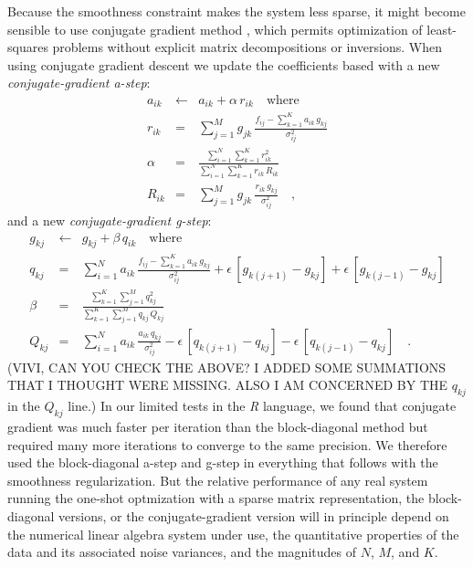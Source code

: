 \documentclass[12pt,preprint]{aastex}
\newcommand{\project}[1]{\textsl{#1}}
\begin{document}
Because the smoothness constraint makes the system less sparse, it
might become sensible to use conjugate gradient method \citep[for
  example,][]{shewchuk}, which permits optimization of least-squares
problems without explicit matrix decompositions or inversions.  When
using conjugate gradient descent we update the coefficients based with
a new \emph{conjugate-gradient a-step}:
\begin{eqnarray}\label{eq:astep_conj}\displaystyle
a_{ik} & \gets & a_{ik}+\alpha\,r_{ik} \quad \mbox{where} \nonumber\\
r_{ik} & = & \sum_{j=1}^{M}g_{jk}\,\frac{f_{ij}-\sum_{k=1}^{K}a_{ik}\,g_{kj}}{\sigma^2_{ij}} \nonumber\\
\alpha & = & \frac{\sum_{i=1}^{N}\sum_{k=1}^{K}r^2_{ik}}{\sum_{i=1}^{N}\sum_{k=1}^{K}r_{ik}\,R_{ik}} \nonumber\\
R_{ik} & = & \sum_{j=1}^{M}g_{jk}\,\frac{r_{ik}\,g_{kj}}{\sigma^2_{ij}}
\quad ,
\end{eqnarray}
and a new \emph{conjugate-gradient g-step}:
\begin{eqnarray}\label{eq:gstep_conj}\displaystyle
g_{kj} & \gets & g_{kj}+\beta\,q_{ik} \quad \mbox{where} \nonumber\\
q_{kj} & = & \sum_{i=1}^{N}a_{ik}\,\frac{f_{ij}-\sum_{k=1}^{K}a_{ik}\,g_{kj}}{\sigma^2_{ij}}+\epsilon\,[g_{k(j+1)}-g_{kj}]+\epsilon\,[g_{k(j-1)}-g_{kj}] \nonumber\\
\beta & = & \frac{\sum_{k=1}^{K}\sum_{j=1}^{M}q^2_{kj}}{\sum_{k=1}^{K}\sum_{j=1}^{M}q_{kj}\,Q_{kj}} \nonumber\\
Q_{kj} & = & \sum_{i=1}^{N}a_{ik}\,\frac{a_{ik}\,q_{kj}}{\sigma^2_{ij}}-\epsilon\,[q_{k(j+1)}-q_{kj}]-\epsilon\,[q_{k(j-1)}-q_{kj}]
\quad .
\end{eqnarray}
(VIVI, CAN YOU CHECK THE ABOVE?  I ADDED SOME SUMMATIONS THAT I
THOUGHT WERE MISSING.  ALSO I AM CONCERNED BY THE $q_{kj}$ in the
$Q_{kj}$ line.)  In our limited tests in the \project{R} language, we
found that conjugate gradient was much faster per iteration than the
block-diagonal method but required many more iterations to converge to
the same precision.  We therefore used the block-diagonal a-step and
g-step in everything that follows with the smoothness regularization.
But the relative performance of any real system running the one-shot
optmization with a sparse matrix representation, the block-diagonal
versions, or the conjugate-gradient version will in principle depend
on the numerical linear algebra system under use, the quantitative
properties of the data and its associated noise variances, and the
magnitudes of $N$, $M$, and $K$.
\end{document}
